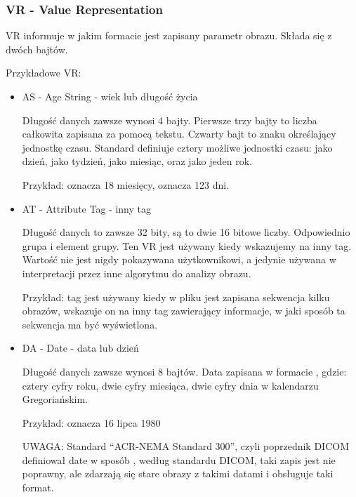 \subsubsection{VR - Value Representation}
\label{sec:dicom-vr}

VR informuje w jakim formacie jest zapisany parametr obrazu.
Składa się z dwóch bajtów.

Przykładowe VR:
\begin{itemize}
    \item AS - Age String - wiek lub długość życia

          Długość danych zawsze wynosi 4 bajty.
          Pierwsze trzy bajty to liczba całkowita zapisana za pomocą tekstu.
          Czwarty bajt to znaku określający jednostkę czasu.
          Standard definiuje cztery możliwe jednostki czasu:  jako dzień,  jako tydzień,  jako miesiąc, oraz  jako jeden rok.

          Przykład:  oznacza 18 miesięcy,  oznacza 123 dni.

    \item AT - Attribute Tag - inny tag

          Długość danych to zawsze 32 bity, są to dwie 16 bitowe liczby.
          Odpowiednio grupa i element grupy.
          Ten VR jest używany kiedy wskazujemy na inny tag.
          Wartość nie jest nigdy pokazywana użytkownikowi, a jedynie używana w interpretacji przez inne algorytmu do analizy obrazu.

          Przykład: tag  jest używany kiedy w pliku jest zapisana sekwencja kilku obrazów, wskazuje on na inny tag zawierający informacje, w jaki sposób ta sekwencja ma być wyświetlona.

    \item DA - Date - data lub dzień

          Długość danych zawsze wynosi 8 bajtów.
          Data zapisana w formacie , gdzie:  cztery cyfry roku,  dwie cyfry miesiąca,  dwie cyfry dnia w kalendarzu Gregoriańskim.

          Przykład:  oznacza 16 lipca 1980

          UWAGA: Standard \enquote{ACR-NEMA Standard 300}, czyli poprzednik DICOM definiował date w sposób , według standardu DICOM, taki zapis jest nie poprawny, ale zdarzają się stare obrazy z takimi datami i  obsługuje taki format.


\end{itemize}
